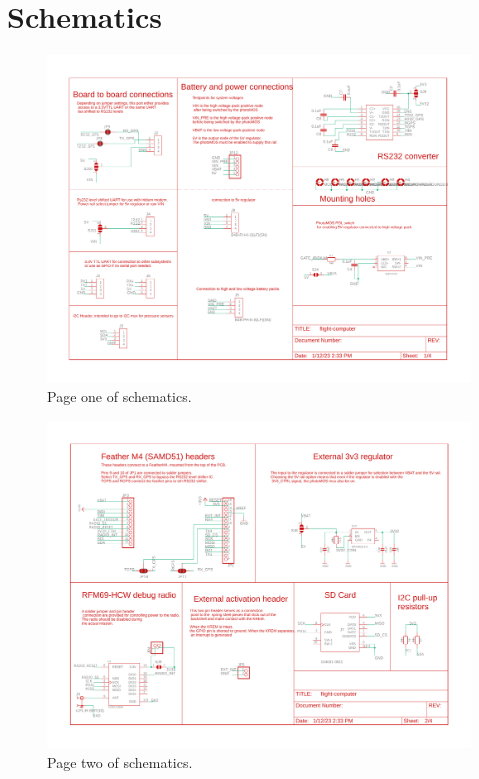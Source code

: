 \documentclass{article}
\begin{document}
\section{Schematics}
\label{appa}

\begin{figure}[H]
    \centering
    \includegraphics[width=\textwidth]{images/flight-computer-schematic-page1.pdf}
    \caption{Page one of schematics.}
    \label{fig:page1-2}
\end{figure}

\begin{figure}[H]
    \centering
    \includegraphics[width=\textwidth]{images/flight-computer-schematic-page2.pdf}
    \caption{Page two of schematics.}
    \label{fig:page1_1}
\end{figure}
\end{document}
